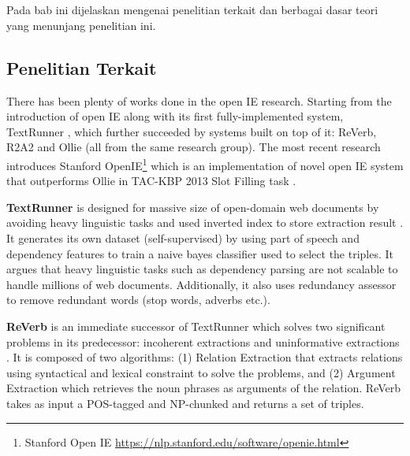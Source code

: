 \chapter{\babDua}
Pada bab ini dijelaskan mengenai penelitian terkait dan berbagai dasar teori yang menunjang penelitian ini.

\section{Penelitian Terkait}

There has been plenty of works done in the open IE research. Starting from the introduction of open IE along with its first fully-implemented system, TextRunner \citep{banko2007open}, which further succeeded by systems built on top of it: ReVerb, R2A2 \citep{etzioni2011open} and Ollie \citep{schmitz2012open} (all from the same research group). The most recent research introduces Stanford OpenIE\footnote{Stanford Open IE \url{https://nlp.stanford.edu/software/openie.html}} which is an implementation of novel open IE system that outperforms Ollie in TAC-KBP
2013 Slot Filling task \citep{angeli2015leveraging}.

\textbf{TextRunner} is designed for massive size of open-domain web documents by avoiding heavy linguistic tasks and used inverted index to store extraction result \citep{banko2007open}. It generates its own dataset (self-supervised) by using part of speech and dependency features to train a naive bayes classifier used to select the triples. It argues that heavy linguistic tasks such as dependency parsing are not scalable to handle millions of web documents. Additionally, it also uses redundancy assessor to remove redundant words (stop words, adverbs etc.).

\textbf{ReVerb} is an immediate successor of TextRunner which solves two significant problems in its predecessor: incoherent extractions and uninformative extractions  \citep{fader2011identifying}. It is composed of two algorithms: (1) Relation Extraction that extracts relations using syntactical and lexical constraint to solve the problems, and (2) Argument Extraction which retrieves the noun phrases as arguments of the relation. ReVerb takes as input a POS-tagged and NP-chunked and returns a set of triples.

